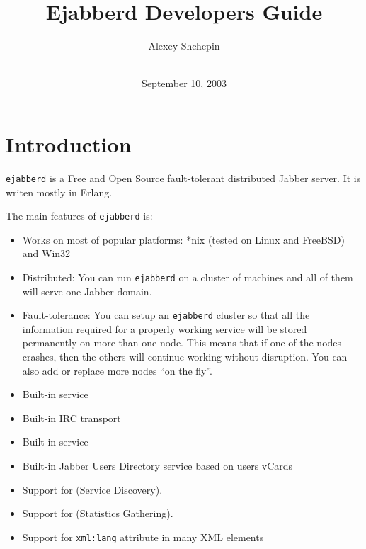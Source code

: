 \documentclass[10pt]{article}
\title{Ejabberd Developers Guide}
\author{Alexey Shchepin \\
  \ahrefurl{mailto:alexey@sevcom.net} \\
  \ahrefurl{xmpp:aleksey@jabber.ru}}
\date{September 10, 2003}
\newcommand{\logoscale}{0.7}
\newcommand{\insscaleimg}[2]{
  \imgsrc{#2}{}
  \begin{latexonly}
    \scalebox{#1}{\texttt{[image: \#2]}}
  \end{latexonly}
}
\newcommand{\ns}[1]{\texttt{#1}}
\newcommand{\ejabberd}{\texttt{ejabberd}}
\newcommand{\Jabber}{Jabber}
\begin{document}
\begin{titlepage}
  \maketitle{}
  
  {\centering
    \insscaleimg{\logoscale}{logo.png}
    \par
  }
\end{titlepage}
\tableofcontents{}

\newpage
\section{Introduction}
\label{sec:intro}

\ejabberd{} is a Free and Open Source fault-tolerant distributed \Jabber{}
server.  It is writen mostly in Erlang.

The main features of \ejabberd{} is:
\begin{itemize}
\item Works on most of popular platforms: *nix (tested on Linux and FreeBSD)
  and Win32
\item Distributed: You can run \ejabberd{} on a cluster of machines and all of
  them will serve one Jabber domain.
\item Fault-tolerance: You can setup an \ejabberd{} cluster so that all the
  information required for a properly working service will be stored
  permanently on more than one node.  This means that if one of the nodes
  crashes, then the others will continue working without disruption.
  You can also add or replace more nodes ``on the fly''.
\item Built-in  service
\item Built-in IRC transport
\item Built-in
  service
\item Built-in Jabber Users Directory service based on users vCards
\item Support for
  (Service Discovery).
\item Support for
  (Statistics Gathering).
\item Support for \ns{xml:lang} attribute in many XML elements
\end{itemize}
\end{document}
